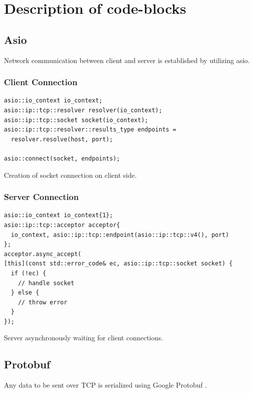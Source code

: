 \documentclass[12pt, letterpaper]{article}
\newenvironment{code}{\captionsetup{type=listing}}{}
\begin{document}
\section{Description of code-blocks}


\subsection{Asio}
Network communication between client and server is established by utilizing asio.

\subsubsection{Client Connection}

\begin{code}
	\begin{verbatim}
asio::io_context io_context;
asio::ip::tcp::resolver resolver(io_context);
asio::ip::tcp::socket socket(io_context);
asio::ip::tcp::resolver::results_type endpoints = 
  resolver.resolve(host, port);

asio::connect(socket, endpoints);

	\end{verbatim}
	\caption{Creation of socket connection on client side.}
	\label{clientConnection}
\end{code}

\pagebreak

\subsubsection{Server Connection}

\begin{code}
	\begin{verbatim}
asio::io_context io_context{1};
asio::ip::tcp::acceptor acceptor{
  io_context, asio::ip::tcp::endpoint(asio::ip::tcp::v4(), port)
};
acceptor.async_accept(
[this](const std::error_code& ec, asio::ip::tcp::socket socket) {
  if (!ec) {
    // handle socket
  } else {
    // throw error
  }
});
	\end{verbatim}
	\caption{Server asynchronously waiting for client connections.}
	\label{serverConnection}
\end{code}

\subsection{Protobuf}
Any data to be sent over TCP is serialized using Google Protobuf \cite{protobuf}.
\end{document}
